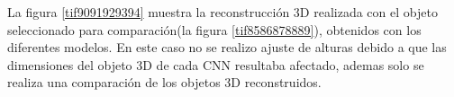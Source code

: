 \documentclass[10pt,letterpaper]{article}
\begin{document}

La figura \ref{tif9091929394} muestra la reconstrucción 3D realizada con el objeto seleccionado para comparación(la figura \ref{tif8586878889}), obtenidos con los diferentes modelos. En este caso no se realizo ajuste de alturas debido a que las dimensiones del objeto 3D de cada CNN resultaba afectado, ademas solo se realiza una comparación de los objetos 3D reconstruidos. 

\begin{figure}[H]
      \begin{center}
\end{center}
\end{figure}
\end{document}

